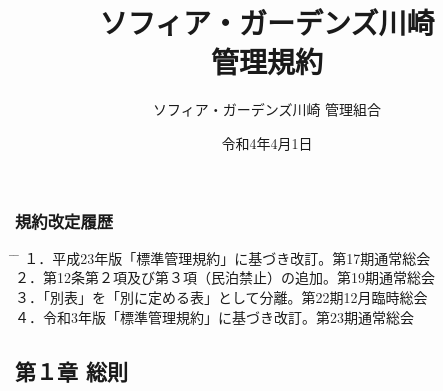 \documentclass[12pt,uplatex,dvipdfmx]{jsarticle}
\title{ソフィア・ガーデンズ川崎\\管理規約}
\begin{document}
\date{令和4年4月1日}
\maketitle
\begin{center}
  \vspace{\baselineskip}
  \vspace{\baselineskip}
  \vspace{\baselineskip}
  \vspace{\baselineskip}
  \vspace{\baselineskip}
  \vspace{\baselineskip}
  \vspace{\baselineskip}
  \vspace{\baselineskip}
  \vspace{\baselineskip}
  \vspace{\baselineskip}
  \vspace{\baselineskip}
  \vspace{\baselineskip}
  \vspace{\baselineskip}
  \vspace{\baselineskip}
  \vspace{\baselineskip}
  \vspace{\baselineskip}
  \vspace{\baselineskip}
  \vspace{\baselineskip}
  \vspace{\baselineskip}
  \vspace{\baselineskip}
  \vspace{\baselineskip}
  \author{\Large ソフィア・ガーデンズ川崎 管理組合}
\end{center}
\vspace{\baselineskip}
\vspace{\baselineskip}
  \subsubsection*{ 規約改定履歴 }
  \vspace{\baselineskip}
  \begin{tabbing}
    \hspace{5mm} \= \hspace{80mm} \= \hspace{100mm} \kill
    １．\>平成23年版「標準管理規約」に基づき改訂。\>第17期通常総会\\
    ２．\>第12条第２項及び第３項（民泊禁止）の追加。\>第19期通常総会\\
    ３．\>「別表」を「別に定める表」として分離。\>第22期12月臨時総会\\
    ４．\>令和3年版「標準管理規約」に基づき改訂。\>第23期通常総会\\
  \end{tabbing}
\clearpage
\tableofcontents
\clearpage
\addtocounter{page}{-3}
\pagestyle{plain}
\begin{center}
\subsection*{第１章 総則}
\end{center}
\end{document}
